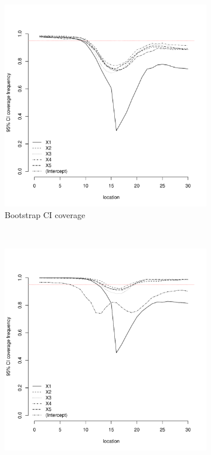 \documentclass[authoryear, review, 11pt]{elsarticle}
\begin{document}
\begin{figure}
	\vspace{-30mm}
	\centering
	\begin{subfigure}[b]{0.45\textwidth}
	\centering
		\includegraphics[width=\textwidth]{../../figures/simulation/15.31.profile_bootstrap_coverage.pdf}
		\caption{Bootstrap CI coverage}
	\end{subfigure}%
	~ %
	\begin{subfigure}[b]{0.45\textwidth}
	\centering
		\includegraphics[width=\textwidth]{../../figures/simulation/15.31.profile_se_coverage.pdf}

\end{subfigure}
\end{figure}
\end{document}
